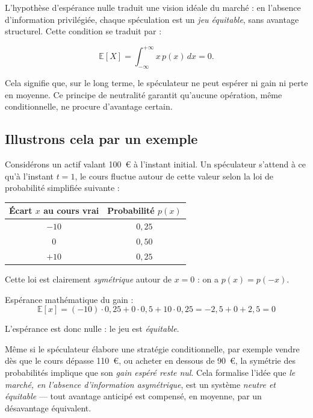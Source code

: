 \documentclass[12pt,a4paper]{article}
\begin{document}
L’hypothèse d’espérance nulle traduit une vision idéale du marché : en l’absence d’information privilégiée, chaque spéculation est un \emph{jeu équitable}, sans avantage structurel. Cette condition se traduit par :

\[
\mathbb{E}[X] = \int_{-\infty}^{+\infty} x \, p(x) \, dx = 0.
\]

Cela signifie que, sur le long terme, le spéculateur ne peut espérer ni gain ni perte en moyenne. Ce principe de neutralité garantit qu’aucune opération, même conditionnelle, ne procure d’avantage certain.

\subsection{Illustrons cela par un exemple}

Considérons un actif valant 100~€ à l’instant initial. Un spéculateur s’attend à ce qu’à l’instant $t = 1$, le cours fluctue autour de cette valeur selon la loi de probabilité simplifiée suivante :

\begin{center}
\begin{tabular}{|c|c|}
\hline
\textbf{Écart $x$ au cours vrai} & \textbf{Probabilité $p(x)$} \\
\hline
$-10$ & $0{,}25$ \\
\hline
$0$   & $0{,}50$ \\
\hline
$+10$ & $0{,}25$ \\
\hline
\end{tabular}
\end{center}

Cette loi est clairement \textit{symétrique} autour de $x=0$ : on a $p(x) = p(-x)$.

Espérance mathématique du gain :
\[
\mathbb{E}[x] = (-10) \cdot 0{,}25 + 0 \cdot 0{,}5 + 10 \cdot 0{,}25 = -2{,}5 + 0 + 2{,}5 = 0
\]

L’espérance est donc nulle : le jeu est \textit{équitable}.

\medskip

Même si le spéculateur élabore une stratégie conditionnelle, par exemple vendre dès que le cours dépasse 110~€, ou acheter en dessous de 90~€, la symétrie des probabilités implique que son \emph{gain espéré reste nul}.
Cela formalise l’idée que \textit{le marché, en l’absence d’information asymétrique}, est un système \textit{neutre et équitable} — tout avantage anticipé est compensé, en moyenne, par un désavantage équivalent.
\end{document}
